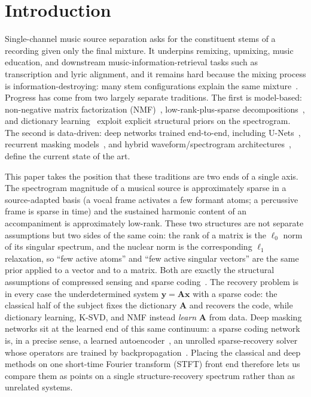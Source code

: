 \documentclass{article}
\newcommand{\A}{\bm{A}}
\newcommand{\xv}{\bm{x}}
\newcommand{\yv}{\bm{y}}
\begin{document}
\section{Introduction}
\label{sec:intro}
Single-channel music source separation asks for the constituent stems of a
recording given only the final mixture. It underpins remixing, upmixing,
music education, and downstream music-information-retrieval tasks such as
transcription and lyric alignment, and it remains hard because the mixing process
is information-destroying: many stem configurations explain the same
mixture~\cite{cano2019introduction,araki2025thirtyyears}. Progress has come from
two largely separate traditions. The first is model-based: non-negative matrix
factorization (NMF)~\cite{lee1999nmf,smaragdis2007convolutive}, low-rank-plus-sparse
decompositions~\cite{huang2012rpca}, and dictionary
learning~\cite{aharon2006ksvd} exploit explicit structural priors on the
spectrogram. The second is data-driven: deep networks trained end-to-end,
including U-Nets~\cite{jansson2017unet,stoller2018waveunet},
recurrent masking models~\cite{stoter2019openunmix}, and hybrid
waveform/spectrogram architectures~\cite{defossez2021demucs,rouard2023htdemucs},
define the current state of the art.

This paper takes the position that these traditions are two ends of a single
axis. The spectrogram magnitude of a musical source is approximately sparse in a
source-adapted basis (a vocal frame activates a few formant atoms; a percussive
frame is sparse in time) and the sustained harmonic content of an accompaniment is
approximately low-rank. These two structures are not separate assumptions but two
sides of the same coin: the rank of a matrix is the $\ell_0$ norm of its singular
spectrum, and the nuclear norm is the corresponding $\ell_1$ relaxation, so
``few active atoms'' and ``few active singular vectors'' are the same prior applied
to a vector and to a matrix. Both are exactly the structural assumptions of
compressed sensing and sparse coding~\cite{donoho2006cs,elad2010sparse}. The
recovery problem is in every case the underdetermined system $\yv=\A\xv$ with a
sparse code: the classical half of the subject fixes the dictionary $\A$ and
recovers the code, while dictionary learning, K-SVD, and NMF instead \emph{learn}
$\A$ from data. Deep masking networks sit at the learned end of this same
continuum: a sparse coding network is, in a precise sense, a learned
autoencoder~\cite{gregor2010lista,papyan2017cnncsc}, an unrolled sparse-recovery
solver whose operators are trained by backpropagation~\cite{monga2021unrolling}.
Placing the classical and deep methods on one short-time Fourier transform (STFT)
front end therefore lets us compare them as points on a single structure-recovery
spectrum rather than as unrelated systems.
\end{document}
